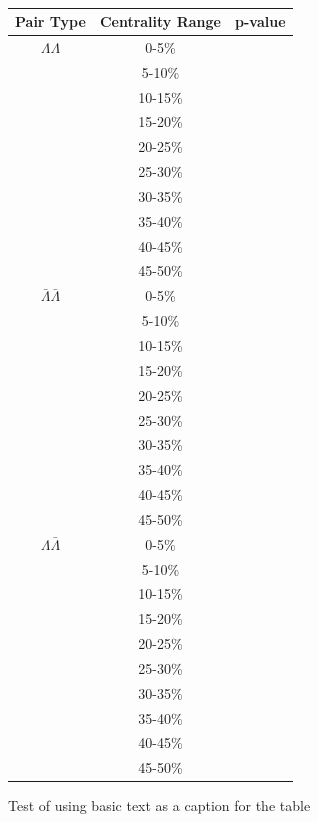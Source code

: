 \begin{table}
\caption {} \label{tab:}
\begin{center}
\begin{tabular}{| c | c | c |}
  \hline                       
  Pair Type & Centrality Range & p-value \\
  \hline
  $\Lambda\Lambda$ & 0-5\% &   \\
   & 5-10\%  &  \\
   & 10-15\% &  \\
   & 15-20\% &  \\
   & 20-25\% &  \\
   & 25-30\% &  \\
   & 30-35\% &  \\
   & 35-40\% &  \\
   & 40-45\% &  \\
   & 45-50\% &  \\
   \hline
  $\bar{\Lambda}\bar{\Lambda}$ &  0-5\% &  \\
   & 5-10\% &  \\
   & 10-15\% &  \\
   & 15-20\% &  \\
   & 20-25\% &  \\
   & 25-30\% &  \\
   & 30-35\% &  \\
   & 35-40\% &  \\
   & 40-45\% &  \\
   & 45-50\% &  \\
   \hline
  $\Lambda\bar{\Lambda}$ &  0-5\% &  \\
   & 5-10\% &  \\
   & 10-15\% &  \\
   & 15-20\% &  \\
   & 20-25\% &  \\
   & 25-30\% &  \\
   & 30-35\% &  \\
   & 35-40\% &  \\
   & 40-45\% &  \\
   & 45-50\% &  \\
  \hline  
\end{tabular}
Test of using basic text as a caption for the table
\end{center}
\end{table}

